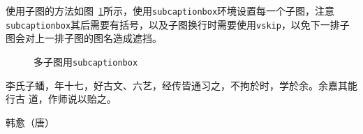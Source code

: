 使用子图的方法如图~\ref{fig:chap2:zitu}所示，使用\texttt{subcaptionbox}环境设置每一个子图，注意\texttt{subcaptionbox}其后需要有括号，以及子图换行时需要使用\texttt{vskip}，以免下一排子图会对上一排子图的图名造成遮挡。
\begin{figure}[htbp]
\centering
\vskip0.5cm
\caption{多子图用\texttt{subcaptionbox}}\label{fig:chap2:zitu}
\end{figure}

李氏子蟠，年十七，好古文、六艺，经传皆通习之，不拘於时，学於余。余嘉其能行古
道，作师说以贻之。

\hfill \pozhehao 韩愈（唐）